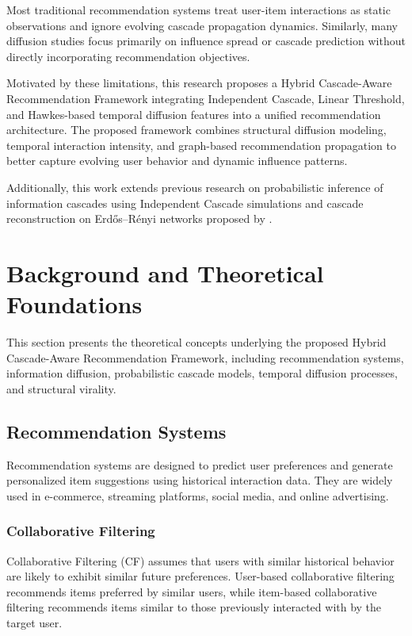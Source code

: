 \documentclass{article}
\begin{document}
Most traditional recommendation systems treat user-item interactions as static observations and ignore evolving cascade propagation dynamics. Similarly, many diffusion studies focus primarily on influence spread or cascade prediction without directly incorporating recommendation objectives.

Motivated by these limitations, this research proposes a Hybrid Cascade-Aware Recommendation Framework integrating Independent Cascade, Linear Threshold, and Hawkes-based temporal diffusion features into a unified recommendation architecture. The proposed framework combines structural diffusion modeling, temporal interaction intensity, and graph-based recommendation propagation to better capture evolving user behavior and dynamic influence patterns.

Additionally, this work extends previous research on probabilistic inference of information cascades using Independent Cascade simulations and cascade reconstruction on Erdős–Rényi networks proposed by \cite{mahanawar2026cascade}.
\section{Background and Theoretical Foundations}

This section presents the theoretical concepts underlying the proposed Hybrid Cascade-Aware Recommendation Framework, including recommendation systems, information diffusion, probabilistic cascade models, temporal diffusion processes, and structural virality.

\subsection{Recommendation Systems}

Recommendation systems are designed to predict user preferences and generate personalized item suggestions using historical interaction data. They are widely used in e-commerce, streaming platforms, social media, and online advertising.

\subsubsection{Collaborative Filtering}

Collaborative Filtering (CF) assumes that users with similar historical behavior are likely to exhibit similar future preferences. User-based collaborative filtering recommends items preferred by similar users, while item-based collaborative filtering recommends items similar to those previously interacted with by the target user.
\end{document}
